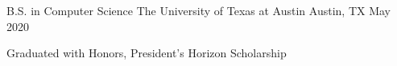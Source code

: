 

\begin{cventries}

  \cventry
  {B.S. in Computer Science} %
  {The University of Texas at Austin} %
  {Austin, TX} %
  {May 2020} %
  {
    \begin{cvitems} %
      \item {Graduated with Honors, President's Horizon Scholarship}
    \end{cvitems}
  }

\end{cventries}
